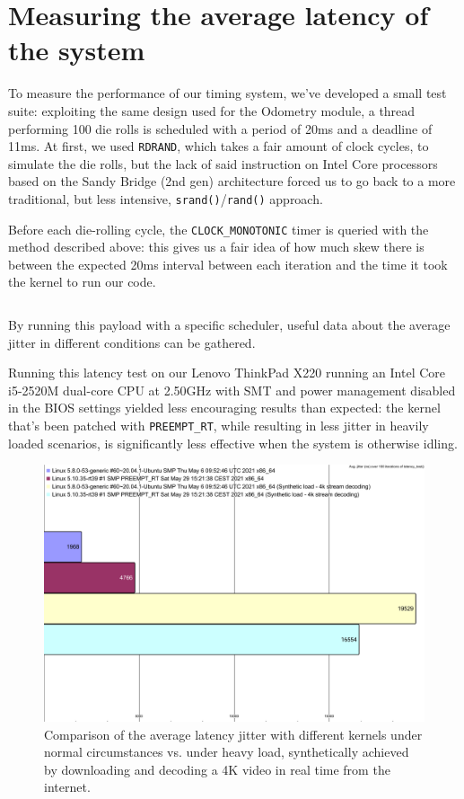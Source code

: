 \documentclass[a4paper,12pt]{report}
\begin{document}
\section{Measuring the average latency of the system}\label{appendix:rt-test-lat}

To measure the performance of our timing system, we've developed a small test suite: exploiting the same design used for the Odometry module, a thread performing 100 die rolls is scheduled with a period of 20ms and a deadline of 11ms. At first, we used \texttt{RDRAND}, which takes a fair amount of clock cycles,  to simulate the die rolls, but the lack of said instruction on Intel Core processors based on the Sandy Bridge (2nd gen) architecture forced us to go back to a more traditional, but less intensive, \texttt{srand()}/\texttt{rand()} approach.

Before each die-rolling cycle, the \texttt{CLOCK\_MONOTONIC} timer is queried with the method described above: this gives us a fair idea of how much skew there is between the expected 20ms interval between each iteration and the time it took the kernel to run our code.

\begin{listing}[H]
\inputminted[frame=single,framesep=10pt]{c}{snippets/latency-test.c}
\caption{By running this payload with a specific scheduler, useful data about the average jitter in different conditions can be gathered.}
\end{listing}

Running this latency test on our Lenovo ThinkPad X220 running an Intel Core i5-2520M dual-core CPU at 2.50GHz with SMT and power management disabled in the BIOS settings yielded less encouraging results than expected: the kernel that's been patched with \texttt{PREEMPT\_RT}, while resulting in less jitter in heavily loaded scenarios, is significantly less effective when the system is otherwise idling.

\begin{figure}[H]
    \centering
    \includegraphics[width=\textwidth]{img/vanilla-vs-rt-chart.pdf}
    \caption{Comparison of the average latency jitter with different kernels under normal circumstances vs. under heavy load, synthetically achieved by downloading and decoding a 4K video in real time from the internet.}
\end{figure}
\end{document}
